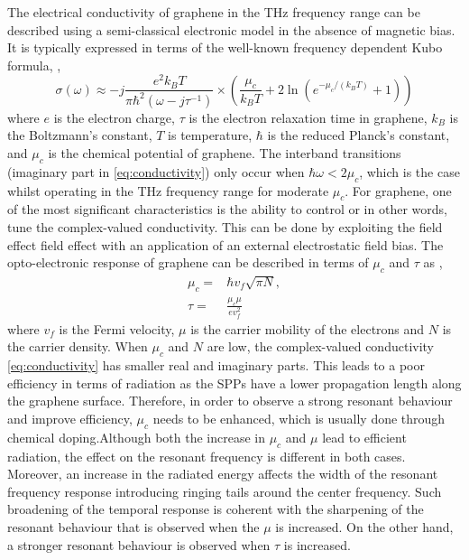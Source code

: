 \documentclass[12pt]{suhbook}
\begin{document}
The electrical conductivity of graphene in the THz frequency range can be described using a semi-classical electronic model in the absence of magnetic bias. It is typically expressed in terms of the well-known frequency dependent Kubo formula, \cite{tamagnone2012analysis},
% 
\begin{equation} 
\sigma \left( \omega \right) \approx -j \frac{{e}^{2} k_{B} T}{\pi \hbar^{2}(\omega - j \tau^{-1})}  \times\left(\frac{\mu_{c}}{k_{B} T} + 2 \ln \left(e^{-\mu_{c} /\left(k_{B} T\right)}+1\right)\right) 
\label{eq:conductivity}
\end{equation}
% 
where $e$ is the electron charge, $\tau$ is the electron relaxation time in graphene, $k_B$ is the Boltzmann’s constant, $T$ is temperature, $\hbar$ is the reduced Planck’s constant, and $\mu_c$ is the chemical potential of graphene. The interband transitions (imaginary part in \eqref{eq:conductivity}) only occur when $\hbar \omega < 2\mu_c$, which is the case whilst operating in the THz frequency range for moderate $\mu_c$. For graphene, one of the most significant characteristics is the ability to control or in other words, tune the complex-valued conductivity. This can be done by exploiting the field effect field effect with an application of an external electrostatic field bias. The opto-electronic response of graphene can be described in terms of $\mu_c$ and $\tau$ as \cite{abadal2015time},
% 
\begin{subequations}
\begin{align}
    \mu_c ={}& \hbar v_f\sqrt{\pi N},
    \label{eq:chem_pot} \\
    \tau ={}& \frac{\mu_c \mu}{e v^2_f}
    \label{eq:rel_time}
\end{align}
\label{eq:opto}
\end{subequations}
% 
where $v_f$ is the Fermi velocity, $\mu$ is the carrier mobility of the electrons and $N$ is the carrier density. When $\mu_c$ and $N$ are low,  the complex-valued conductivity \eqref{eq:conductivity} has smaller real and imaginary parts. This leads to a poor efficiency in terms of radiation as the SPPs have a lower propagation length along the graphene surface. Therefore, in order to observe a strong resonant behaviour and improve efficiency, $\mu_c$ needs to be enhanced, which is usually done through chemical doping.Although both the increase in $\mu_c$ and $\mu$ lead to efficient radiation, the effect on the resonant frequency is different in both cases. Moreover, an increase in the radiated energy affects the width of the resonant frequency response introducing ringing tails around the center frequency. Such broadening of the temporal response is coherent with the sharpening of the resonant behaviour that is observed when the $\mu$ is increased. On the other hand, a stronger resonant behaviour is observed when $\tau$ is increased.
\end{document}
